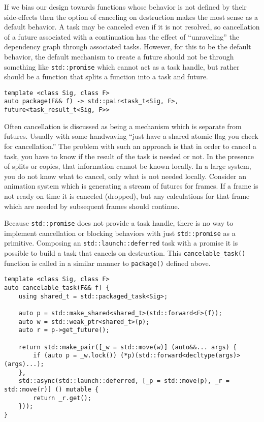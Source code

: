 If we bias our design towards functions whose behavior is not defined by their side-effects then the option of canceling on destruction makes the most sense as a default behavior. A task may be canceled even if it is not resolved, so cancellation of a future associated with a continuation has the effect of “unraveling” the dependency graph through associated tasks. However, for this to be the default behavior, the default mechanism to create a future should not be through something like \texttt{std::promise} which cannot act as a task handle, but rather should be a function that splits a function into a task and future.

\begin{verbatim}
template <class Sig, class F>
auto package(F&& f) -> std::pair<task_t<Sig, F>, future<task_result_t<Sig, F>>
\end{verbatim}

Often cancellation is discussed as being a mechanism which is separate from futures. Usually with some handwaving “just have a shared atomic flag you check for cancellation.” The problem with such an approach is that in order to cancel a task, you have to know if the result of the task is needed or not. In the presence of splits or copies, that information cannot be known locally. In a large system, you do not know what to cancel, only what is not needed locally. Consider an animation system which is generating a stream of futures for frames. If a frame is not ready on time it is canceled (dropped), but any calculations for that frame which are needed by subsequent frames should continue.

Because \texttt{std::promise} does not provide a task handle, there is no way to implement cancellation or blocking behaviors with just \texttt{std::promise} as a primitive. Composing an \texttt{std::launch::deferred} task with a promise it is possible to build a task that cancels on destruction. This \texttt{cancelable_task()} function is called in a similar manner to \texttt{package()} defined above.

\begin{verbatim}
template <class Sig, class F>
auto cancelable_task(F&& f) {
    using shared_t = std::packaged_task<Sig>;

    auto p = std::make_shared<shared_t>(std::forward<F>(f));
    auto w = std::weak_ptr<shared_t>(p);
    auto r = p->get_future();

    return std::make_pair([_w = std::move(w)] (auto&&... args) {
        if (auto p = _w.lock()) (*p)(std::forward<decltype(args)>(args)...);
    },
    std::async(std::launch::deferred, [_p = std::move(p), _r = std::move(r)] () mutable {
        return _r.get();
    }));
}
\end{verbatim}



